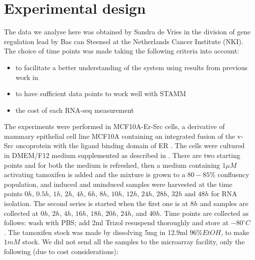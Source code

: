\section{Experimental design}
\label{sec:experimental-design}

The data we analyse here was obtained by Sandra de Vries in the division of gene regulation lead by Bas can Steensel at the Netherlands Cancer Institute (NKI). The choice of time points was made taking the following criteria into account:
\begin{itemize}
\item to facilitate a better understanding of the system using results from previous work in \cite{Hirsch:2010ec}
\item to have sufficient data points to work well with STAMM
\item the cost of each RNA-seq measurement
\end{itemize}

The experiments were performed in MCF10A-Er-Src cells, a derivative of mammary epithelial cell line MCF10A containing an integrated fusion of the v-Src oncoprotein with the ligand binding domain of ER \citep{Hirsch:2010ec,Iliopoulos:2009do}. The cells were cultured in DMEM/F12 medium supplemented as described in \cite{Debnath:2003km}. There are two starting points and for both the medium is refreshed, then a medium containing $1 \mu M$ activating tamoxifen is added and the mixture is grown to a $80 - 85\%$ confluency population, and induced and uninduced samples were harvested at the time points $ 0h$, $ 0.5h$, $ 1h$, $ 2h$, $ 4h$, $ 6h$, $ 8h$, $ 10h$, $ 12h$, $ 24h$, $ 28h$, $ 32h \text{ and } 48h$ for RNA isolation. The second series is started when the first one is at $8h$ and samples are collected at $0h$, $2h$, $4h$, $16h$, $18h$, $20h$, $24h$, and $40h$. Time points are collected as follows: wash with PBS; add 2ml Trizol resuspend thoroughly and store at $-80^{\circ}C$. The tamoxifen stock was made by dissolving 5mg in 12.9ml $96\% EtOH $, to make $ 1mM$ stock. We did not send all the samples to the microarray facility, only the following (due to cost considerations):

